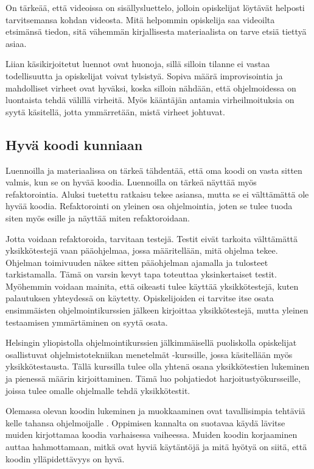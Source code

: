 On tärkeää, että videoissa on sisällysluettelo, jolloin opiskelijat löytävät
helposti tarvitsemansa kohdan videosta. Mitä helpommin opiskelija saa videoilta
etsimänsä tiedon, sitä vähemmän kirjallisesta materiaalista on tarve etsiä
tiettyä asiaa.

Liian käsikirjoitetut luennot ovat huonoja, sillä silloin tilanne ei vastaa
todellisuutta ja opiskelijat voivat tylsistyä. Sopiva määrä improvisointia ja
mahdolliset virheet ovat hyväksi, koska silloin nähdään, että ohjelmoidessa on
luontaista tehdä välillä virheitä. Myös kääntäjän antamia virheilmoituksia on
syytä käsitellä, jotta ymmärretään, mistä virheet johtuvat.

\subsection{Hyvä koodi kunniaan}

Luennoilla ja materiaalissa on tärkeä tähdentää, että oma koodi on vasta sitten
valmis, kun se on hyvää koodia. Luennoilla on tärkeä näyttää myös
refaktorointia. Aluksi tuetettu ratkaisu tekee asiansa, mutta se ei välttämättä
ole hyvää koodia. Refaktorointi on yleinen osa ohjelmointia, joten se tulee
tuoda siten myös esille ja näyttää miten refaktoroidaan.

Jotta voidaan refaktoroida, tarvitaan testejä. Testit eivät tarkoita välttämättä
yksikkötestejä vaan pääohjelmaa, jossa määritellään, mitä ohjelma tekee.
Ohjelman toimivuuden näkee sitten pääohjelman ajamalla ja tulosteet
tarkistamalla. Tämä on varsin kevyt tapa toteuttaa yksinkertaiset testit.
Myöhemmin voidaan mainita, että oikeasti tulee käyttää yksikkötestejä, kuten
palautuksen yhteydessä on käytetty. Opiskelijoiden ei tarvitse itse osata
ensimmäisten ohjelmointikurssien jälkeen kirjoittaa yksikkötestejä, mutta
yleinen testaamisen ymmärtäminen on syytä osata.

Helsingin yliopistolla ohjelmointikurssien jälkimmäisellä puoliskolla
opiskelijat osallistuvat ohjelmistotekniikan menetelmät -kurssille, jossa
käsitellään myös yksikkötestausta. Tällä kurssilla tulee olla yhtenä osana
yksikkötestien lukeminen ja pienessä määrin kirjoittaminen. Tämä luo pohjatiedot
harjoitustyökursseille, joissa tulee omalle ohjelmalle tehdä yksikkötestit.

Olemassa olevan koodin lukeminen ja muokkaaminen ovat tavallisimpia tehtäviä
kelle tahansa ohjelmoijalle \cite{Kolling:2008}. Oppimisen kannalta on suotavaa
käydä lävitse muiden kirjottamaa koodia varhaisessa vaiheessa. Muiden koodin
korjaaminen auttaa hahmottamaan, mitkä ovat hyviä käytäntöjä ja mitä hyötyä on
siitä, että koodin ylläpidettävyys on hyvä.

